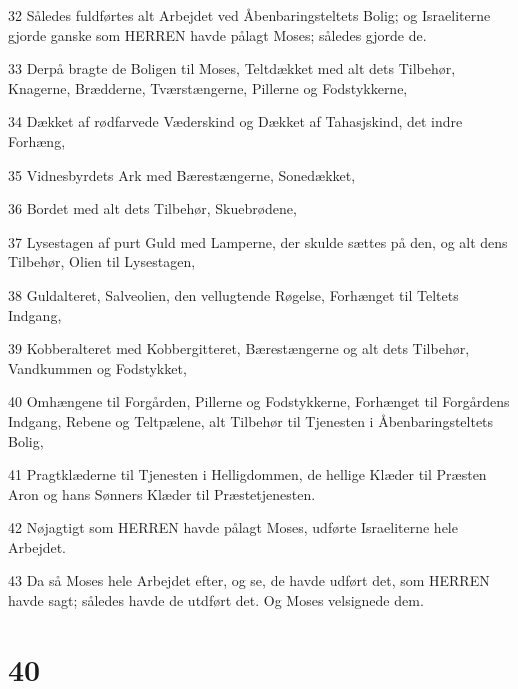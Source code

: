\par 32 Således fuldførtes alt Arbejdet ved Åbenbaringsteltets Bolig; og Israeliterne gjorde ganske som HERREN havde pålagt Moses; således gjorde de.
\par 33 Derpå bragte de Boligen til Moses, Teltdækket med alt dets Tilbehør, Knagerne, Brædderne, Tværstængerne, Pillerne og Fodstykkerne,
\par 34 Dækket af rødfarvede Væderskind og Dækket af Tahasjskind, det indre Forhæng,
\par 35 Vidnesbyrdets Ark med Bærestængerne, Sonedækket,
\par 36 Bordet med alt dets Tilbehør, Skuebrødene,
\par 37 Lysestagen af purt Guld med Lamperne, der skulde sættes på den, og alt dens Tilbehør, Olien til Lysestagen,
\par 38 Guldalteret, Salveolien, den vellugtende Røgelse, Forhænget til Teltets Indgang,
\par 39 Kobberalteret med Kobbergitteret, Bærestængerne og alt dets Tilbehør, Vandkummen og Fodstykket,
\par 40 Omhængene til Forgården, Pillerne og Fodstykkerne, Forhænget til Forgårdens Indgang, Rebene og Teltpælene, alt Tilbehør til Tjenesten i Åbenbaringsteltets Bolig,
\par 41 Pragtklæderne til Tjenesten i Helligdommen, de hellige Klæder til Præsten Aron og hans Sønners Klæder til Præstetjenesten.
\par 42 Nøjagtigt som HERREN havde pålagt Moses, udførte Israeliterne hele Arbejdet.
\par 43 Da så Moses hele Arbejdet efter, og se, de havde udført det, som HERREN havde sagt; således havde de utdført det. Og Moses velsignede dem.

\chapter{40}

